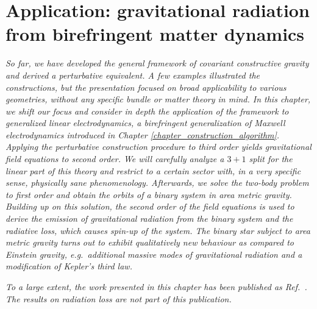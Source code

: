 \chapter{Application: gravitational radiation from birefringent matter dynamics}
\label{chapter_weak_area}

\textit{So far, we have developed the general framework of covariant constructive gravity and derived a perturbative equivalent. A few examples illustrated the constructions, but the presentation focused on broad applicability to various geometries, without any specific bundle or matter theory in mind. In this chapter, we shift our focus and consider in depth the application of the framework to generalized linear electrodynamics, a birefringent generalization of Maxwell electrodynamics introduced in Chapter \ref{chapter_construction_algorithm}. Applying the perturbative construction procedure to third order yields gravitational field equations to second order. We will carefully analyze a $3+1$ split for the linear part of this theory and restrict to a certain sector with, in a very specific sense, physically sane phenomenology. Afterwards, we solve the two-body problem to first order and obtain the orbits of a binary system in area metric gravity. Building up on this solution, the second order of the field equations is used to derive the emission of gravitational radiation from the binary system and the radiative loss, which causes spin-up of the system. The binary star subject to area metric gravity turns out to exhibit qualitatively new behaviour as compared to Einstein gravity, e.g.~additional massive modes of gravitational radiation and a modification of Kepler's third law.}

\textit{To a large extent, the work presented in this chapter has been published as Ref.~\cite{grav_rad_paper}. The results on radiation loss are not part of this publication.}

